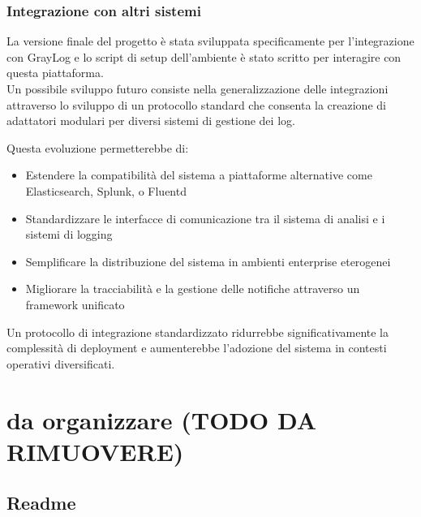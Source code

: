\documentclass[12pt]{report}
\begin{document}
\subsection{Integrazione con altri sistemi}
\label{subsec:integrazione_sistemi}

La versione finale del progetto è stata sviluppata specificamente per l'integrazione con GrayLog e lo script di setup dell'ambiente è stato scritto per interagire con questa piattaforma. \\
Un possibile sviluppo futuro consiste nella generalizzazione delle integrazioni attraverso lo sviluppo di un protocollo standard che consenta la creazione di adattatori modulari per diversi sistemi di gestione dei log.

Questa evoluzione permetterebbe di:
\begin{itemize}
    \item Estendere la compatibilità del sistema a piattaforme alternative come Elasticsearch, Splunk, o Fluentd
    \item Standardizzare le interfacce di comunicazione tra il sistema di analisi e i sistemi di logging
    \item Semplificare la distribuzione del sistema in ambienti enterprise eterogenei
    \item Migliorare la tracciabilità e la gestione delle notifiche attraverso un framework unificato
\end{itemize}

Un protocollo di integrazione standardizzato ridurrebbe significativamente la complessità di deployment e aumenterebbe l'adozione del sistema in contesti operativi diversificati.



\chapter{da organizzare (TODO DA RIMUOVERE)}
\label{chap:da_organizzare}

\section{Readme}
\label{sec:readme}
\end{document}
